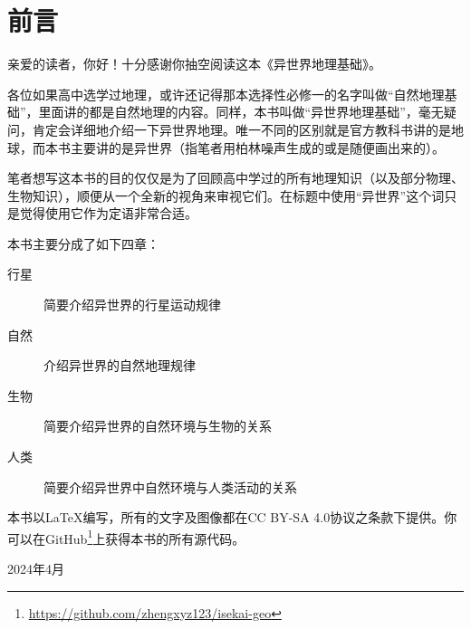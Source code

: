 \section*{前言}
亲爱的读者，你好！十分感谢你抽空阅读这本《异世界地理基础》。

各位如果高中选学过地理，或许还记得那本选择性必修一的名字叫做“自然地理基础”，里面讲的都是自然地理的内容。同样，本书叫做“异世界地理基础”，毫无疑问，肯定会详细地介绍一下异世界地理。唯一不同的区别就是官方教科书讲的是地球，而本书主要讲的是异世界（指笔者用柏林噪声生成的或是随便画出来的）。

笔者想写这本书的目的仅仅是为了回顾高中学过的所有地理知识（以及部分物理、生物知识），顺便从一个全新的视角来审视它们。在标题中使用“异世界”这个词只是觉得使用它作为定语非常合适。

本书主要分成了如下四章：
\begin{description}
    \item[行星] 简要介绍异世界的行星运动规律
    \item[自然] 介绍异世界的自然地理规律
    \item[生物] 简要介绍异世界的自然环境与生物的关系
    \item[人类] 简要介绍异世界中自然环境与人类活动的关系
\end{description}

本书以\LaTeX 编写，所有的文字及图像都在CC BY-SA 4.0协议之条款下提供。你可以在GitHub\footnote{\url{https://github.com/zhengxyz123/isekai-geo}}上获得本书的所有源代码。

\begin{flushright}
    2024年4月
\end{flushright}
